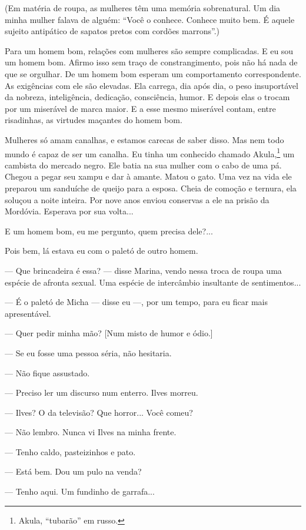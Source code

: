 (Em matéria de roupa, as mulheres têm uma memória sobrenatural. Um dia
minha mulher falava de alguém: ``Você o conhece. Conhece muito bem. É
aquele sujeito antipático de sapatos pretos com cordões marrons''.)

Para um homem bom, relações com mulheres são sempre complicadas. E eu
sou um homem bom. Afirmo isso sem traço de constrangimento, pois não há
nada de que se orgulhar. De um homem bom esperam um comportamento
correspondente. As exigências com ele são elevadas. Ela carrega, dia
após dia, o peso insuportável da nobreza, inteligência, dedicação,
consciência, humor. E depois elas o trocam por um miserável de marca
maior. E a esse mesmo miserável contam, entre risadinhas, as virtudes
maçantes do homem bom.

Mulheres só amam canalhas, e estamos carecas de saber disso. Mas nem
todo mundo é capaz de ser um canalha. Eu tinha um conhecido chamado
Akula,\footnote{Akula, ``tubarão'' em russo.} um cambista do mercado
negro. Ele batia na sua mulher com o cabo de uma pá. Chegou a pegar seu
xampu e dar à amante. Matou o gato. Uma vez na vida ele preparou um
sanduíche de queijo para a esposa. Cheia de comoção e ternura, ela
soluçou a noite inteira. Por nove anos enviou conservas a ele na prisão
da Mordóvia. Esperava por sua volta...

E um homem bom, eu me pergunto, quem precisa dele?...

Pois bem, lá estava eu com o paletó de outro homem.

--- Que brincadeira é essa? --- disse Marina, vendo nessa troca de roupa
uma espécie de afronta sexual. Uma espécie de intercâmbio insultante de
sentimentos...

--- É o paletó de Micha --- disse eu ---, por um tempo, para eu ficar
mais apresentável.

--- Quer pedir minha mão? {[}Num misto de humor e ódio.{]}

--- Se eu fosse uma pessoa séria, não hesitaria.

--- Não fique assustado.

--- Preciso ler um discurso num enterro. Ilves morreu.

--- Ilves? O da televisão? Que horror... Você comeu?

--- Não lembro. Nunca vi Ilves na minha frente.

--- Tenho caldo, pasteizinhos e pato.

--- Está bem. Dou um pulo na venda?

--- Tenho aqui. Um fundinho de garrafa...

